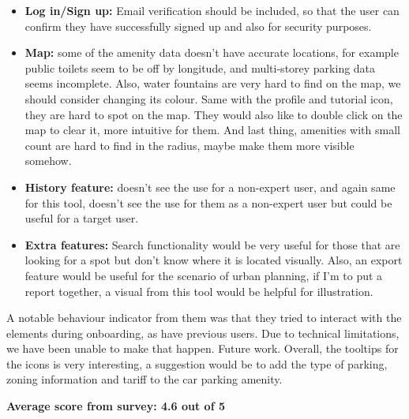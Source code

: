 \begin{itemize}
    \item \textbf{Log in/Sign up: }Email verification should be included, so
          that the user can confirm they have successfully signed up and also for
          security purposes.
          \vspace{0.2cm}
          
    \item \textbf{Map: }some of the amenity data doesn't have accurate
          locations, for example public toilets seem to be off by longitude, and
          multi-storey parking data seems incomplete. Also, water fountains are very
          hard to find on the map, we should consider changing its colour. Same with
          the profile and tutorial icon, they are hard to spot on the map. They would
          also like to double click on the map to clear it, more intuitive for them.
          And last thing, amenities with small count are hard to find in the radius,
          maybe make them more visible somehow.
          \vspace{0.2cm}
          
    \item \textbf{History feature: }doesn't see the use for a non-expert user,
          and again same for this tool, doesn't see the use for them as a non-expert
          user but could be useful for a target user.
          \vspace{0.2cm}
          
    \item \textbf{Extra features: }Search functionality would be very useful for
          those that are looking for a spot but don't know where it is located
          visually. Also, an export feature would be useful for the scenario of urban
          planning, if I'm to put a report together, a visual from this tool would be
          helpful for illustration.
\end{itemize}

\newpage{}

A notable behaviour indicator from them was that they tried to interact with the
elements during onboarding, as have previous users. Due to technical
limitations, we have been unable to make that happen. Future work.
Overall, the tooltips for the icons is very interesting, a suggestion would be
to add the type of parking, zoning information and tariff to the car parking
amenity.

\textbf{Average score from survey: 4.6 out of 5}

